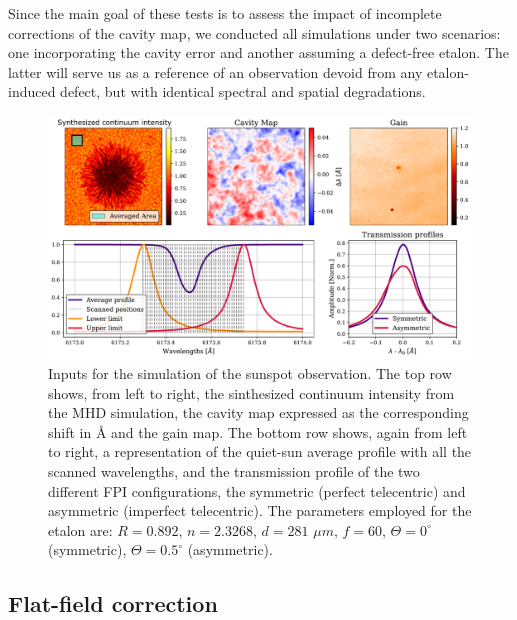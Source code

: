 Since the main goal of these tests is to assess the impact of incomplete corrections of the cavity map, we conducted all simulations under two scenarios: one incorporating the cavity error and another assuming a defect-free etalon. The latter will serve us as a reference of an observation devoid from any etalon-induced defect, but with identical spectral and spatial degradations. 

\begin{figure}[t]
    \includegraphics[width=\textwidth]{figures/Mancha/Inputs_mancha.pdf}
    \caption[Sunspot simulation inputs.]{
      Inputs for the simulation of the sunspot observation. The top row shows, from left to right, the sinthesized continuum intensity from the MHD simulation, the cavity map expressed as the corresponding shift in \r{A} and the gain map. The bottom row shows, again from left to right, a representation of the quiet-sun average profile with all the scanned wavelengths, and the transmission profile of the two different FPI configurations, the symmetric (perfect telecentric) and asymmetric (imperfect telecentric). The parameters employed for the etalon are: $R=0.892$, $n = 2.3268$, $d = 281$ $\mu m$, $f = 60$, $\Theta = 0^{\circ}$ (symmetric), $\Theta = 0.5^{\circ}$ (asymmetric).
      \label{fig_mancha: Inputs}}
\end{figure}

\subsection{\label{sect: mancha_ff_corr}Flat-field correction}

